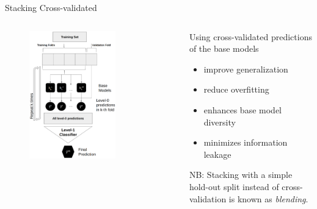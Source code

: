 \documentclass[11pt,compress,t,notes=noshow, xcolor=table]{beamer}
\begin{document}
\begin{vbframe}{Stacking Cross-validated}

\begin{columns}
    \begin{column}{0.6\textwidth}
        \vspace{-1em}
        \begin{figure}
            \centering
            \includegraphics[width=0.7\textwidth]{figure/stacking_cv_better.png}
            \label{fig:stacking_cv}
        \end{figure}
    \end{column}
    \begin{column}{0.4\textwidth}
        Using cross-validated predictions of the base models
        \begin{itemize}
            \item improve generalization
            \item reduce overfitting
            \item enhances base model diversity
            \item minimizes information leakage
        \end{itemize}
        \vspace{1em}
        NB: Stacking with a simple hold-out split instead of cross-validation is known as \emph{blending}.
    \end{column}
\end{columns}
\end{vbframe}
\end{document}
